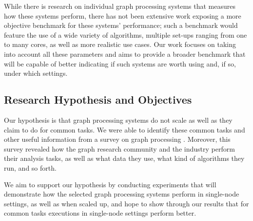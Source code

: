 \documentclass[a4paper,11pt]{article}
\begin{document}
\par While there is research on individual graph processing systems that measures how these systems perform, there has not been extensive work exposing a more objective benchmark for these systems' performance; such a benchmark would feature the use of a wide variety of algorithms, multiple set-ups ranging from one to many cores, as well as more realistic use cases. Our work focuses on taking into account all these parameters and aims to provide a broader benchmark that will be capable of better indicating if such systems are worth using and, if so, under which settings.


\subsection{Research Hypothesis and Objectives} \label{hypothesis}

\par Our hypothesis is that graph processing systems do not scale as well as they claim to do for common tasks. We were able to identify these common tasks and other useful information from a survey on graph processing \cite{survey}. Moreover, this survey revealed how the graph research community and the industry perform their analysis tasks, as well as what data they use, what kind of algorithms they run, and so forth.

\par We aim to support our hypothesis by conducting experiments that will demonstrate how the selected graph processing systems perform in single-node settings, as well as when scaled up, and hope to show through our results that for common tasks executions in single-node settings perform better.

\end{document}
